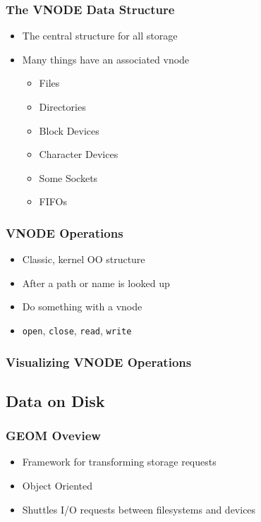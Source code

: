 \documentclass[pdftex]{beamer} %
\begin{document}
\begin{frame}
  \frametitle{The VNODE Data Structure}
  \begin{itemize}
  \item The central structure for all storage
  \item Many things have an associated vnode
    \begin{itemize}
    \item Files
    \item Directories
    \item Block Devices
    \item Character Devices
    \item Some Sockets
    \item FIFOs
    \end{itemize}
  \end{itemize}
\end{frame}

\begin{frame}[fragile]
  \frametitle{VNODE Operations}
  \begin{itemize}
  \item Classic, kernel OO structure
  \item After a path or name is looked up
  \item Do something with a vnode
  \item \verb|open|, \verb|close|, \verb|read|, \verb|write|
  \end{itemize}
\end{frame}

\begin{frame}
  \frametitle{Visualizing VNODE Operations}
  
\end{frame}

\subsection{Data on Disk}
\label{sec:disk}

\begin{frame}
  \frametitle{GEOM Oveview}
  \begin{itemize}
  \item Framework for transforming storage requests
  \item Object Oriented
  \item Shuttles I/O requests between filesystems and devices
  \end{itemize}
\end{frame}
\end{document}
